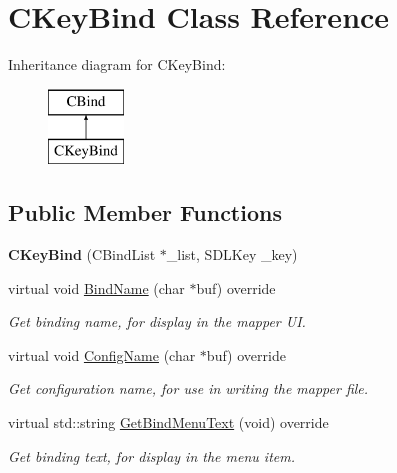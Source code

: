 \hypertarget{classCKeyBind}{\section{C\-Key\-Bind Class Reference}
\label{classCKeyBind}
}
Inheritance diagram for C\-Key\-Bind\-:\begin{figure}[H]
\begin{center}
\leavevmode
\includegraphics[height=2.000000cm]{classCKeyBind}
\end{center}
\end{figure}
\subsection*{Public Member Functions}
\begin{DoxyCompactItemize}
\item 
\hypertarget{classCKeyBind_ace188d08c2721d5f5074cdbd0e52b681}{{\bfseries C\-Key\-Bind} (C\-Bind\-List $\ast$\-\_\-list, S\-D\-L\-Key \-\_\-key)}\label{classCKeyBind_ace188d08c2721d5f5074cdbd0e52b681}

\item 
\hypertarget{classCKeyBind_a651434f767706a9699fa7d4932ba6f23}{virtual void \hyperlink{classCKeyBind_a651434f767706a9699fa7d4932ba6f23}{Bind\-Name} (char $\ast$buf) override}\label{classCKeyBind_a651434f767706a9699fa7d4932ba6f23}

\begin{DoxyCompactList}\small\item\em Get binding name, for display in the mapper U\-I. \end{DoxyCompactList}\item 
\hypertarget{classCKeyBind_a17bec47906f3ed97b16503264e6c1f2f}{virtual void \hyperlink{classCKeyBind_a17bec47906f3ed97b16503264e6c1f2f}{Config\-Name} (char $\ast$buf) override}\label{classCKeyBind_a17bec47906f3ed97b16503264e6c1f2f}

\begin{DoxyCompactList}\small\item\em Get configuration name, for use in writing the mapper file. \end{DoxyCompactList}\item 
\hypertarget{classCKeyBind_a205913cae606e3a235d72a9ebad85cb5}{virtual std\-::string \hyperlink{classCKeyBind_a205913cae606e3a235d72a9ebad85cb5}{Get\-Bind\-Menu\-Text} (void) override}\label{classCKeyBind_a205913cae606e3a235d72a9ebad85cb5}

\begin{DoxyCompactList}\small\item\em Get binding text, for display in the menu item. \end{DoxyCompactList}\end{DoxyCompactItemize}
